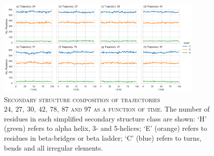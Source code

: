 \begin{figure}[ph!]
 \centering
 \includegraphics[width=0.9\textwidth]{chapters/aadh/figures/drift_trajs_dssp.png}
 \caption[Secondary structure composition of select trajectories]{\textsc{Secondary structure composition of trajectories $24,\ 27,\ 30,\ 42,\ 78,\ 87$ and $97$ as a function of time}. The number of residues in each simplified secondary structure class \cite{kabschDictionaryProteinSecondary1983} are shown: `H' (green) refers to alpha helix, 3- and 5-helices; `E' (orange) refers to residues in beta-bridges or beta ladder; `C' (blue) refers to turns, bends and all irregular elements.}
 \label{fig:dssp_trajs_sens}
\end{figure}

